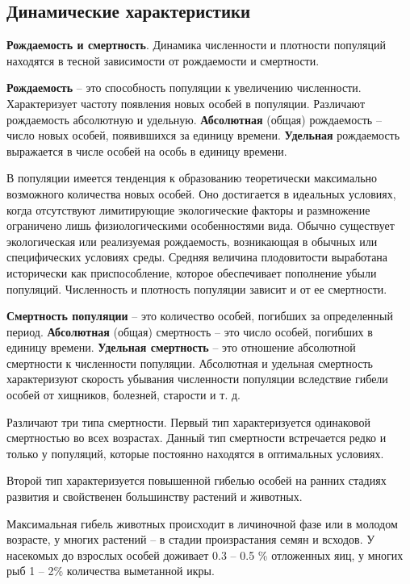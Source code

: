 \documentclass[a5paper, 11pt]{extarticle}
\theoremstyle{definition}
\theoremstyle{definition}
\theoremstyle{definition}
\numberwithin{figure}{section}
\begin{document}
\subsection{Динамические характеристики}

\textbf{Рождаемость и смертность}. Динамика численности и плотности популяций находятся в тесной зависимости от рождаемости и смертности.

\textbf{Рождаемость} -- это способность популяции к увеличению численности. Характеризует частоту появления новых особей в популяции. Различают рождаемость абсолютную и удельную. \textbf{Абсолютная} (общая) рождаемость -- число новых особей, появившихся за единицу времени. \textbf{Удельная} рождаемость выражается в числе особей на особь в единицу времени.

В популяции имеется тенденция к образованию теоретически максимально возможного количества новых особей. Оно достигается в идеальных условиях, когда отсутствуют лимитирующие экологические факторы и размножение ограничено лишь физиологическими особенностями вида. Обычно существует экологическая или реализуемая рождаемость, возникающая в обычных или специфических условиях среды. Средняя величина плодовитости выработана исторически как приспособление, которое обеспечивает пополнение убыли популяций. Численность и плотность популяции зависит и от ее смертности.

\textbf{Смертность популяции} -- это количество особей, погибших за определенный период. \textbf{Абсолютная} (общая) смертность -- это число особей, погибших в единицу времени. \textbf{Удельная смертность} -- это отношение абсолютной смертности к численности популяции. Абсолютная и удельная смертность характеризуют скорость убывания численности популяции вследствие гибели особей от хищников, болезней, старости и т. д.

Различают три типа смертности. Первый тип характеризуется одинаковой смертностью во всех возрастах. Данный тип смертности встречается редко и только у популяций, которые постоянно находятся в оптимальных условиях.

Второй тип характеризуется повышенной гибелью особей на ранних стадиях развития и свойственен большинству растений и животных.

Максимальная гибель животных происходит в личиночной фазе или в молодом возрасте, у многих растений -- в стадии произрастания семян и всходов. У насекомых до взрослых особей доживает 0.3 -- 0.5 \% отложенных яиц, у многих рыб 1 -- 2\% количества выметанной икры.
\end{document}

